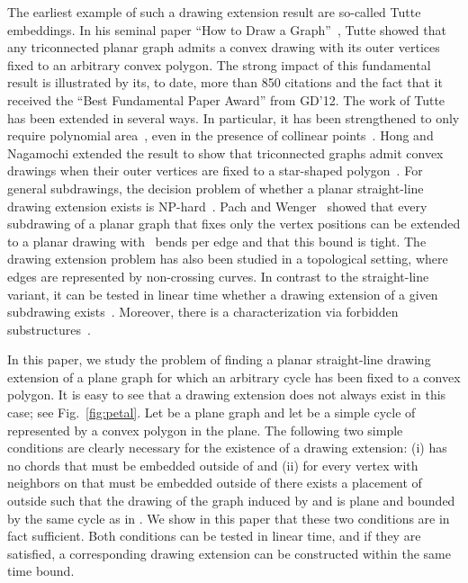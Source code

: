 \documentclass{llncs}
\begin{document}
The earliest example of such a drawing extension result are so-called Tutte
embeddings.  In his seminal paper ``How to Draw a
Graph''~\cite{t-hdg-63}, Tutte showed that any triconnected planar
graph admits a convex drawing with its outer vertices fixed to an
arbitrary convex polygon.  The strong impact of this fundamental
result is illustrated by its, to date, more than 850 citations and the
fact that it received the ``Best Fundamental Paper Award'' from GD'12.
The work of Tutte has been extended in several ways.  In particular,
it has been strengthened to only require polynomial
area~\cite{dgk-pdhgg-11}, even in the presence of collinear
points~\cite{cegl-dgppo-12}.  Hong and Nagamochi extended the result
to show that triconnected graphs admit convex drawings when their
outer vertices are fixed to a star-shaped polygon~\cite{HongN08}.  For
general subdrawings, the decision problem of whether a planar straight-line
drawing extension exists is NP-hard~\cite{Patrignani06}.  Pach and
Wenger~\cite{PW98} showed that every subdrawing of a planar graph that
fixes only the vertex positions can be extended to a planar drawing
with~ bends per edge and that this bound is tight.  The drawing
extension problem has also been studied in a topological setting,
where edges are represented by non-crossing curves.  In contrast to
the straight-line variant, it can be tested in linear time whether a
drawing extension of a given subdrawing exists~\cite{ADFJKPR10}.
Moreover, there is a characterization via forbidden
substructures~\cite{jkr-ktppg-13}.


In this paper, we study the problem of finding a planar straight-line
drawing extension of a plane graph for which an arbitrary cycle has
been fixed to a convex polygon.  It is easy to see that
a drawing extension does not always exist in this case; see Fig.~\ref{fig:petal}. 
Let  be a plane graph and let  be a simple cycle of  represented by
a convex polygon  in the plane. The following two simple conditions are clearly necessary for the existence of a drawing extension: (i)  has no chords that must be embedded outside of  and  (ii) for every vertex  with neighbors on  that must be embedded outside of  there exists a placement of  outside  such that the drawing of the graph induced by  and  is plane and bounded by the same cycle as in . We show in this paper that these two conditions are in fact sufficient. Both conditions can be tested in linear time, and if they are satisfied, a corresponding drawing extension can be constructed within the same time bound.
\end{document}
